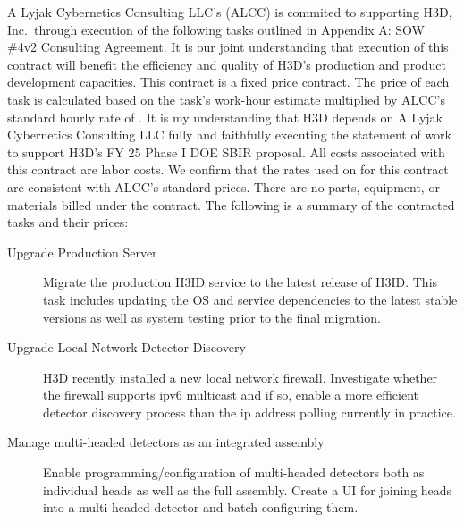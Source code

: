 \documentclass[8pt, letterpaper]{awesome-cv} %
\begin{document}
\makecvheader %

\makelettertitle %


\begin{cvletter}
  A Lyjak Cybernetics Consulting LLC's (ALCC) is commited to supporting H3D, Inc.\ through execution
  of the following tasks outlined in Appendix A: SOW \#4v2 Consulting Agreement. It is our joint
  understanding that execution of this contract will benefit the efficiency and quality of H3D's
  production and product development capacities. This contract is a fixed price contract. The price
  of each task is calculated based on the task's work-hour estimate multiplied by ALCC's standard
  hourly rate of . It is my understanding that H3D depends on A Lyjak
  Cybernetics Consulting LLC fully and faithfully executing the statement of work to support H3D's
  FY 25 Phase I DOE SBIR proposal. All costs associated with this contract are labor costs. We
  confirm that the rates used on for this contract are consistent with ALCC's standard prices. There
  are no parts, equipment, or materials billed under the contract. The following is a summary of the
  contracted tasks and their prices:

  \begin{description}
    \item[Upgrade Production Server] Migrate the production H3ID service to the latest release of
      H3ID. This task includes updating the OS and service dependencies to the latest stable
      versions as well as system testing prior to the final migration. 

    \item[Upgrade Local Network Detector Discovery] H3D recently installed a new local network
      firewall. Investigate whether the firewall supports ipv6 multicast and if so, enable a more
      efficient detector discovery process than the ip address polling currently in
      practice. 

    \item[Manage multi-headed detectors as an integrated assembly] Enable programming/configuration
      of multi-headed detectors both as individual heads as well as the full assembly. Create a UI
      for joining heads into a multi-headed detector and batch configuring
      them. 


\end{description}
\end{cvletter}
\end{document}
